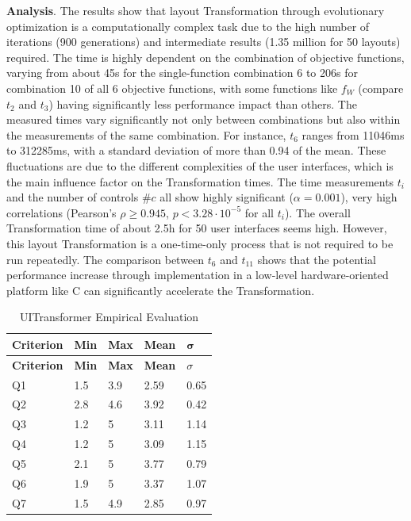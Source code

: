 \textbf{Analysis}.
The results show that layout \gls{Transformation} through evolutionary optimization is a computationally complex task due to the high number of iterations (900 generations) and intermediate results (1.35 million for 50 layouts) required.
The time is highly dependent on the combination of objective functions, varying from about 45s for the single-function combination 6 to 206s for combination 10 of all 6 objective functions, with some functions like \(f_W\) (compare \(t_2\) and \(t_3\)) having significantly less performance impact than others.
The measured times vary significantly not only between combinations but also within the measurements of the same combination.
For instance, \(t_6\) ranges from 11046ms to 312285ms, with a standard deviation of more than 0.94 of the mean.
These fluctuations are due to the different complexities of the user interfaces, which is the main influence factor on the \gls{Transformation} times.
The time measurements \(t_i\) and the number of controls \(\# c\) all show highly significant (\(\alpha = 0.001\)), very high correlations (Pearson's \(\rho \geq 0.945\), \(p < 3.28 \cdot 10^{-5}\) for all \(t_i\)).
The overall \gls{Transformation} time of about 2.5h for 50 user interfaces seems high.
However, this layout \gls{Transformation} is a one-time-only process that is not required to be run repeatedly.
The comparison between \(t_6\) and \(t_11\) shows that the potential performance increase through implementation in a low-level hardware-oriented platform like C can significantly accelerate the \gls{Transformation}.
\hypertarget{tbl:uitransformer.empirical}{}
\begin{xltabular}{0.75\linewidth}[h!]{@{}lllll@{}}
\caption{\label{tbl:uitransformer.empirical}UITransformer Empirical Evaluation}\tabularnewline
\toprule
\textbf{Criterion} & \textbf{Min} & \textbf{Max} & \textbf{Mean} & \textbf{\(\bm{\sigma}\)}\tabularnewline
\midrule
\endfirsthead
\toprule
\textbf{Criterion} & \textbf{Min} & \textbf{Max} & \textbf{Mean} & \textbf{\(\sigma\)}\tabularnewline
\midrule
\endhead
Q1 & 1.5 & 3.9 & 2.59 & 0.65\tabularnewline
Q2 & 2.8 & 4.6 & 3.92 & 0.42\tabularnewline
Q3 & 1.2 & 5 & 3.11 & 1.14\tabularnewline
Q4 & 1.2 & 5 & 3.09 & 1.15\tabularnewline
Q5 & 2.1 & 5 & 3.77 & 0.79\tabularnewline
Q6 & 1.9 & 5 & 3.37 & 1.07\tabularnewline
Q7 & 1.5 & 4.9 & 2.85 & 0.97\tabularnewline
\bottomrule
\end{xltabular}

